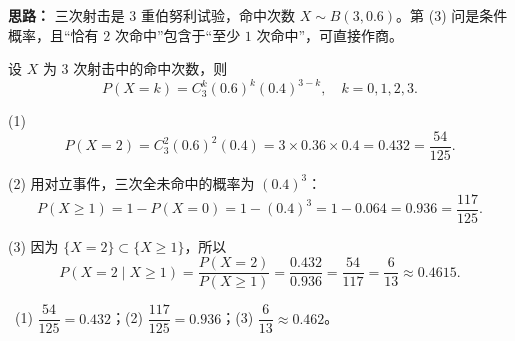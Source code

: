 \ifshowsolutions%
\textbf{思路：} 三次射击是 $3$ 重伯努利试验，命中次数 $X\sim B(3,0.6)$。第 (3) 问是条件概率，且“恰有 $2$ 次命中”包含于“至少 $1$ 次命中”，可直接作商。

设 $X$ 为 $3$ 次射击中的命中次数，则
\[
P(X=k)=C_3^k(0.6)^k(0.4)^{3-k},\quad k=0,1,2,3.
\]

(1)
\[
P(X=2)=C_3^2(0.6)^2(0.4)=3\times0.36\times0.4=0.432=\frac{54}{125}.
\]

(2) 用对立事件，三次全未命中的概率为 $(0.4)^3$：
\[
P(X\ge1)=1-P(X=0)=1-(0.4)^3=1-0.064=0.936=\frac{117}{125}.
\]

(3) 因为 $\{X=2\}\subset\{X\ge1\}$，所以
\[
P(X=2\mid X\ge1)=\frac{P(X=2)}{P(X\ge1)}
=\frac{0.432}{0.936}=\frac{54}{117}=\frac{6}{13}\approx0.4615.
\]

\ (1) $\dfrac{54}{125}=0.432$；(2) $\dfrac{117}{125}=0.936$；(3) $\dfrac{6}{13}\approx0.462$。

\else \answerarea[10] \fi%
